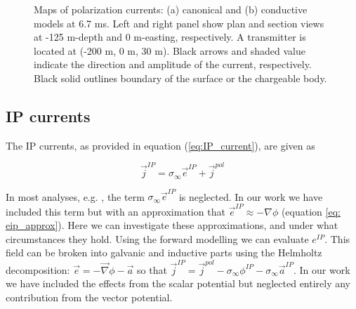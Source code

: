 \documentclass[extra,mreferee]{gji}
\newcommand{\grad}{\vec \nabla}
\newcommand{\siginf}{\sigma_\infty}
\renewcommand {\j}  { {\vec j} }
\newcommand {\e}  { {\vec e} }
\begin{document}
\begin{figure}
  \caption{Maps of polarization currents: (a) canonical and (b) conductive models at 6.7 ms. Left and right panel show plan and section views at -125 m-depth and 0 m-easting, respectively. A transmitter is located at (-200 m, 0 m, 30 m). Black arrows and shaded value indicate the direction and amplitude of the current, respectively. Black solid outlines boundary of the surface or the chargeable body.}
  \label{F:Polarizationcurrent_late}
\end{figure}
\clearpage

\subsection{IP currents}

The IP currents, as provided in equation (\ref{eq:IP_current}), are given as 
\begin{linenomath*}
\begin{equation}
  \j^{IP}=\siginf  \e^{IP} + \j^{pol}
\end{equation}
\end{linenomath*}
In most analyses, e.g. \cite{Smith1988a}, the term $\siginf \e^{IP}$ is neglected. In our work we have included this term but with an approximation that $\e^{IP} \approx -\nabla \phi$  (equation \ref{eq: eip_approx}). Here we can investigate these approximations, and under what circumstances they hold. Using the forward modelling we can evaluate $e^{IP}$.
This field can be broken into galvanic and inductive parts using the Helmholtz decomposition: $\e=-\grad \phi-\vec{a}$ so that $\j^{IP} = \j^{pol} -\siginf \phi^{IP} - \siginf \vec{a}^{IP}$.
In our work we have included the effects from the scalar potential but neglected entirely any contribution from the vector potential. 
\end{document}
